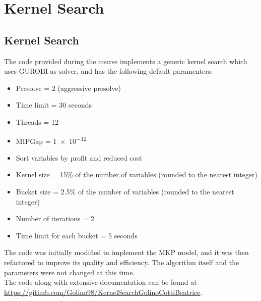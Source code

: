 \chapter{Kernel Search}

\section{Kernel Search}
The code provided during the course implements a generic kernel search
which uses GUROBI as solver, and has the following default paramenters:
\begin{itemize}
	\item Presolve = 2 (aggressive presolve)
	\item Time limit = 30 seconds
	\item Threads = 12
	\item MIPGap = \num{1e-12}
	\item Sort variables by profit and reduced cost
	\item Kernel size = 15\% of the number of variables (rounded to the nearest integer)
	\item Bucket size = 2.5\% of the number of variables (rounded to the nearest integer)
	\item Number of iterations = 2
	\item Time limit for each bucket = 5 seconds
\end{itemize}
The code was initially modified to implement the MKP model, and it was then
refactored to improve its quality and efficiency.
The algorithm itself and the parameters were not changed at this time.\\
The code along with extensive documentation can be found at
\url{https://github.com/Golino98/KernelSearchGolinoCottiBeatrice}.